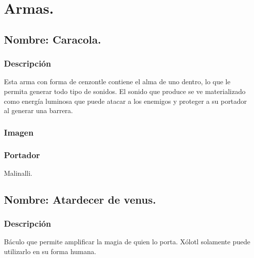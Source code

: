 \chapter{Armas.}
\section{Nombre: Caracola.} \label{Arma:Caracola}
\subsection{Descripción}
Esta arma con forma de cenzontle contiene el alma de uno dentro, lo que le permita generar todo tipo de sonidos. El sonido que produce se ve materializado como energía luminosa que puede atacar a los enemigos y proteger a su portador al generar una barrera.
\subsection{Imagen}

\subsection{Portador}
Malinalli.
\section{Nombre: Atardecer de venus.}\label{Arma:BaculoXolotl}
	\subsection{Descripción}
		Báculo que permite amplificar la magia de quien lo porta. Xólotl solamente puede utilizarlo en su forma humana.
